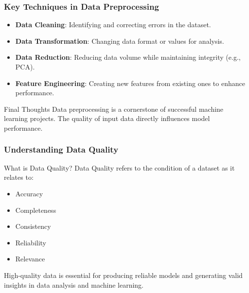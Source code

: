 \documentclass[aspectratio=169]{beamer}
\begin{document}
\begin{frame}[fragile]
    \frametitle{Key Techniques in Data Preprocessing}
    \begin{itemize}
        \item \textbf{Data Cleaning}: Identifying and correcting errors in the dataset.
        \item \textbf{Data Transformation}: Changing data format or values for analysis.
        \item \textbf{Data Reduction}: Reducing data volume while maintaining integrity (e.g., PCA).
        \item \textbf{Feature Engineering}: Creating new features from existing ones to enhance performance.
    \end{itemize}
    \begin{block}{Final Thoughts}
        Data preprocessing is a cornerstone of successful machine learning projects. The quality of input data directly influences model performance. 
    \end{block}
\end{frame}

\begin{frame}[fragile]
    \frametitle{Understanding Data Quality}
    \begin{block}{What is Data Quality?}
        Data Quality refers to the condition of a dataset as it relates to:
        \begin{itemize}
            \item Accuracy
            \item Completeness
            \item Consistency
            \item Reliability
            \item Relevance
        \end{itemize}
        High-quality data is essential for producing reliable models and generating valid insights in data analysis and machine learning.
    \end{block}
\end{frame}
\end{document}
